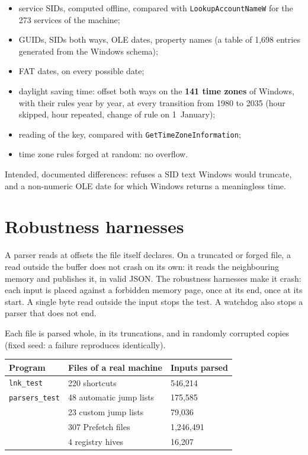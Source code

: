 \documentclass[11pt,a4paper,oneside]{report}
\begin{document}
\begin{itemize}
  \item service SIDs, computed offline, compared with
    \texttt{LookupAccountNameW} for the 273 services of the machine;
  \item GUIDs, SIDs both ways, OLE dates, property names (a table of 1,698
    entries generated from the Windows schema);
  \item FAT dates, on every possible date;
  \item daylight saving time: offset both ways on the \textbf{141 time zones}
    of Windows, with their rules year by year, at every transition from 1980 to
    2035 (hour skipped, hour repeated, change of rule on 1~January);
  \item reading of the  key, compared with
    \texttt{GetTimeZoneInformation};
  \item time zone rules forged at random: no overflow.
\end{itemize}

Intended, documented differences: \wac{} refuses a SID text Windows would
truncate, and a non-numeric OLE date for which Windows returns a meaningless
time.

\section{Robustness harnesses}

A parser reads at offsets the file itself declares. On a truncated or forged
file, a read outside the buffer does not crash on its own: it reads the
neighbouring memory and publishes it, in valid JSON. The robustness harnesses
make it crash: each input is placed against a forbidden memory page, once at
its end, once at its start. A single byte read outside the input stops the
test. A watchdog also stops a parser that does not end.

Each file is parsed whole, in its truncations, and in randomly corrupted copies
(fixed seed: a failure reproduces identically).

\begin{longtable}{@{}L{4.2cm}L{6.4cm}L{4.4cm}@{}}
\toprule
\textbf{Program} & \textbf{Files of a real machine} & \textbf{Inputs parsed} \\
\midrule
\endhead
\texttt{lnk\_test} & 220 shortcuts & 546,214 \\
\texttt{parsers\_test} & 48 automatic jump lists & 175,585 \\
 & 23 custom jump lists & 79,036 \\
 & 307 Prefetch files & 1,246,491 \\
 & 4 registry hives & 16,207 \\
\bottomrule
\end{longtable}
\end{document}
